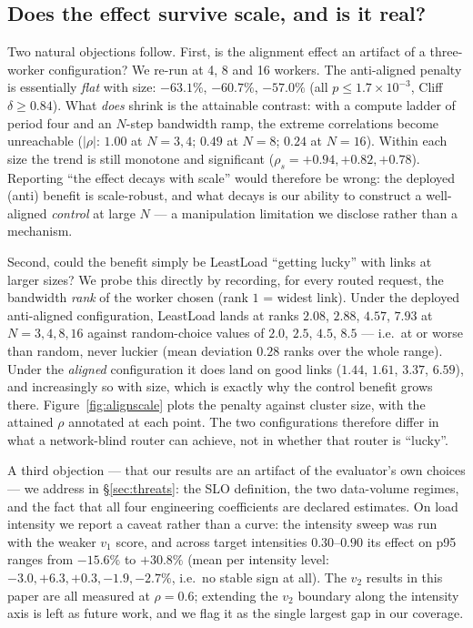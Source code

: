 \subsection{Does the effect survive scale, and is it real?}
Two natural objections follow. First, is the alignment effect an artifact of a three-worker
configuration? We re-run at 4, 8 and 16 workers. The anti-aligned penalty is essentially
\emph{flat} with size: $-63.1\%$, $-60.7\%$, $-57.0\%$ (all $p\le1.7\times10^{-3}$, Cliff
$\delta\ge0.84$). What \emph{does} shrink is the attainable contrast: with a compute ladder of
period four and an $N$-step bandwidth ramp, the extreme correlations become unreachable
($|\rho|$: $1.00$ at $N{=}3,4$; $0.49$ at $N{=}8$; $0.24$ at $N{=}16$). Within each size the
trend is still monotone and significant ($\rho_s=+0.94,+0.82,+0.78$). Reporting
``the effect decays with scale'' would therefore be wrong: the deployed (anti) benefit is
scale-robust, and what decays is our ability to construct a well-aligned \emph{control} at large
$N$ --- a manipulation limitation we disclose rather than a mechanism.

Second, could the benefit simply be LeastLoad ``getting lucky'' with links at larger sizes? We
probe this directly by recording, for every routed request, the bandwidth \emph{rank} of the
worker chosen (rank $1$ = widest link). Under the deployed anti-aligned configuration, LeastLoad
lands at ranks $2.08$, $2.88$, $4.57$, $7.93$ at $N=3,4,8,16$ against random-choice values of
$2.0$, $2.5$, $4.5$, $8.5$ --- i.e.~at or worse than random, never luckier (mean deviation
$0.28$ ranks over the whole range). Under the \emph{aligned} configuration it does land on good
links ($1.44$, $1.61$, $3.37$, $6.59$), and increasingly so with size, which is exactly why the
control benefit grows there. Figure~\ref{fig:alignscale} plots the penalty against cluster size, with the attained $\rho$ annotated at each point. The two configurations therefore differ in what a network-blind
router can achieve, not in whether that router is ``lucky''.

A third objection --- that our results are an artifact of the evaluator's own choices --- we
address in \S\ref{sec:threats}: the SLO definition, the two data-volume regimes, and the fact
that all four engineering coefficients are declared estimates. On load intensity we report a
caveat rather than a curve: the intensity sweep was run with the weaker $v_1$ score, and across
target intensities $0.30$--$0.90$ its effect on p95 ranges from $-15.6\%$ to $+30.8\%$
(mean per intensity level: $-3.0,+6.3,+0.3,-1.9,-2.7\%$, i.e.~no stable sign at all). The
$v_2$ results in this paper are all measured at $\rho=0.6$; extending the \emph{$v_2$} boundary
along the intensity axis is left as future work, and we flag it as the single largest gap in our
coverage.
